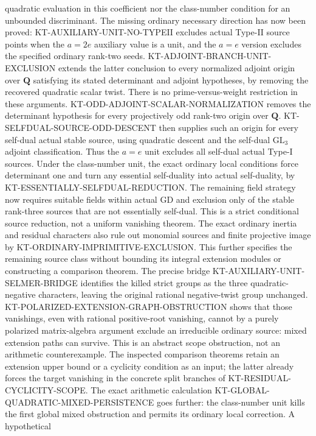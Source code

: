 quadratic evaluation in this coefficient nor the class-number
condition for an unbounded discriminant.
The missing ordinary necessary direction has now been proved:
KT-AUXILIARY-UNIT-NO-TYPEII excludes actual Type-II source points
when the $a=2e$ auxiliary value is a unit, and the $a=e$ version
excludes the specified ordinary rank-two seeds.
KT-ADJOINT-BRANCH-UNIT-EXCLUSION extends the latter conclusion
to every normalized adjoint origin over $\mathbf Q$ satisfying
its stated determinant and adjoint hypotheses, by removing
the recovered quadratic scalar twist. There is no
prime-versus-weight restriction in these arguments.
KT-ODD-ADJOINT-SCALAR-NORMALIZATION removes the determinant
hypothesis for every projectively odd rank-two origin over
$\mathbf Q$. KT-SELFDUAL-SOURCE-ODD-DESCENT then supplies
such an origin for every self-dual actual stable source, using
quadratic descent and the self-dual $\mathrm{GL}_3$ adjoint
classification. Thus the $a=e$ unit excludes all self-dual
actual Type-I sources. Under the class-number unit, the exact
ordinary local conditions force determinant one and turn any
essential self-duality into actual self-duality, by
KT-ESSENTIALLY-SELFDUAL-REDUCTION.
The remaining field strategy now requires suitable fields
within actual GD and exclusion only of the stable rank-three
sources that are not essentially self-dual. This is a strict
conditional source reduction, not a uniform vanishing theorem.
The exact ordinary inertia and residual characters also rule
out monomial sources and finite projective image by
KT-ORDINARY-IMPRIMITIVE-EXCLUSION. This further specifies the
remaining source class without bounding its integral extension
modules or constructing a comparison theorem.
The precise bridge KT-AUXILIARY-UNIT-SELMER-BRIDGE identifies
the killed strict groups as the three quadratic-negative
characters, leaving the original rational negative-twist
group unchanged. KT-POLARIZED-EXTENSION-GRAPH-OBSTRUCTION
shows that those vanishings, even with rational positive-root
vanishing, cannot by a purely polarized matrix-algebra argument
exclude an irreducible ordinary source: mixed extension paths
can survive. This is an abstract scope obstruction, not an
arithmetic counterexample. The inspected comparison theorems
retain an extension upper bound or a cyclicity condition as an
input; the latter already forces the target vanishing in the
concrete split branches of KT-RESIDUAL-CYCLICITY-SCOPE.
The exact arithmetic calculation
KT-GLOBAL-QUADRATIC-MIXED-PERSISTENCE goes further:
the class-number unit kills the first global mixed obstruction
and permits its ordinary local correction. A hypothetical
